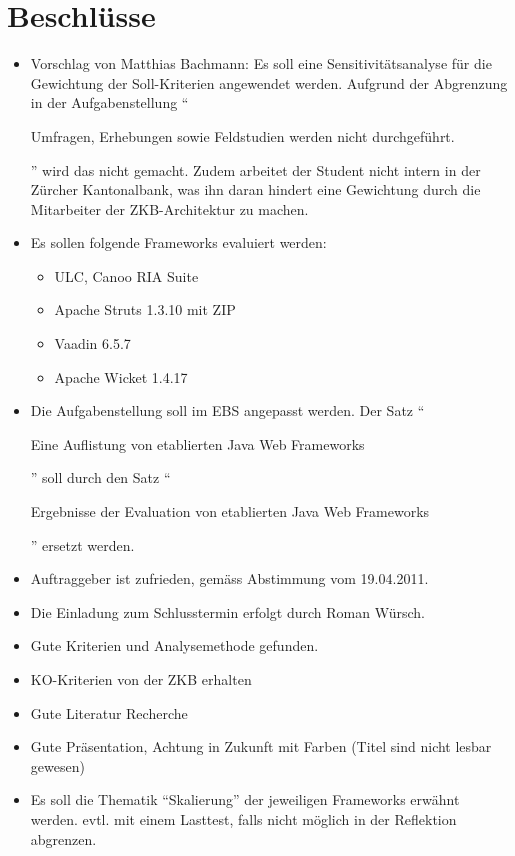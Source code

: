   \section{Beschlüsse}
  \begin{itemize}
      \item Vorschlag von Matthias Bachmann: Es soll eine Sensitivitätsanalyse
      für die Gewichtung der Soll-Kriterien angewendet werden. Aufgrund der
      Abgrenzung in der Aufgabenstellung ``\begin{itshape}Umfragen, Erhebungen
      sowie Feldstudien werden nicht durchgeführt.\end{itshape}'' wird das
      nicht gemacht. Zudem arbeitet der Student nicht intern in der Zürcher
      Kantonalbank, was ihn daran hindert eine Gewichtung durch die Mitarbeiter
      der ZKB-Architektur zu machen.
      \item Es sollen folgende Frameworks evaluiert werden:
      \begin{itemize}
        \item ULC, Canoo RIA Suite
        \item Apache Struts 1.3.10 mit ZIP
        \item Vaadin 6.5.7
        \item Apache Wicket 1.4.17
      \end{itemize}
      \item Die Aufgabenstellung soll im EBS angepasst werden. Der Satz
      ``\begin{itshape}Eine Auflistung von etablierten Java Web
      Frameworks\end{itshape}'' soll durch den Satz
      ``\begin{itshape}Ergebnisse der Evaluation von etablierten Java Web
      Frameworks\end{itshape}'' ersetzt werden.
      \item Auftraggeber ist zufrieden, gemäss Abstimmung vom 19.04.2011.
      \item Die Einladung zum Schlusstermin erfolgt durch Roman Würsch.
      \item Gute Kriterien und Analysemethode gefunden.
      \item KO-Kriterien von der ZKB erhalten
      \item Gute Literatur Recherche
      \item Gute Präsentation, Achtung in Zukunft mit Farben (Titel sind nicht
      lesbar gewesen)
      \item Es soll die Thematik ``Skalierung'' der jeweiligen Frameworks
      erwähnt werden. evtl. mit einem Lasttest, falls nicht möglich in der
      Reflektion abgrenzen.
  \end{itemize}